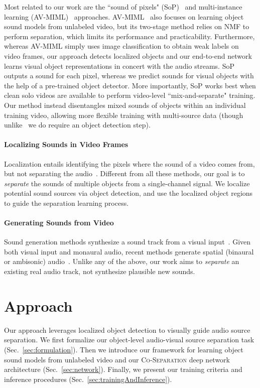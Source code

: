 \documentclass[10pt,twocolumn,letterpaper]{article}
\begin{document}
Most related to our work are the ``sound of pixels" (SoP)~\cite{zhao2018sound} and multi-instance learning (AV-MIML)~\cite{gao2018objectSounds} approaches.
AV-MIML~\cite{gao2018objectSounds} also focuses on learning object sound models from unlabeled video, but its two-stage method relies on NMF to perform separation, which limits its performance and practicability. Furthermore, whereas AV-MIML simply uses image classification to obtain weak labels on video frames, our approach detects localized objects and our end-to-end network learns visual object representations in concert with the audio streams. SoP~\cite{zhao2018sound} outputs a sound for each pixel, whereas we predict sounds for visual objects with the help of a pre-trained object detector. More importantly, SoP works best when clean solo videos are available to perform video-level ``mix-and-separate" training. Our method instead disentangles mixed sounds of objects within an individual training video, allowing more flexible training with multi-source data (though unlike~\cite{zhao2018sound} we do require an object detection step).  



\vspace{-0.2in}
\paragraph{Localizing Sounds in Video Frames}
Localization entails identifying the pixels where the sound of a video  comes from, but not separating the audio~\cite{kidron2005pixels,hershey2000audio,fisher2001learning,arandjelovic2017objects,Senocak_2018_CVPR,tian2018audio}. Different from all these methods, our goal is to \emph{separate} the sounds of multiple objects from a single-channel signal.  We localize potential sound sources via object detection, and use the localized object regions to guide the separation learning process.

\paragraph{Generating Sounds from Video}
Sound generation methods synthesize a sound track from a visual input~\cite{owens2016visually,zhou2017visual,chen2017}. Given both visual input and monaural audio, recent methods generate spatial (binaural or ambisonic) audio~\cite{gao2019visualsound,morgadoNIPS18}. Unlike any of the above, our work aims to \emph{separate} an existing real audio track, not synthesize plausible new sounds. \section{Approach}
Our approach leverages localized object detection to visually guide audio source separation. We first formalize our object-level audio-visual source separation task (Sec.~\ref{sec:formulation}). Then we introduce our framework for learning object sound models from unlabeled video and our \textsc{Co-Separation} deep network architecture (Sec.~\ref{sec:network}). Finally, we present our training criteria and inference procedures (Sec.~\ref{sec:trainingAndInference}).
\end{document}

